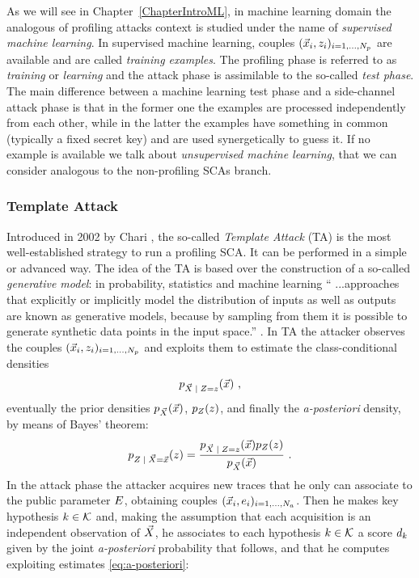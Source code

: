 As we will see in Chapter~\ref{ChapterIntroML}, in machine learning domain the analogous of profiling attacks context is studied under the name of \emph{supervised machine learning}. In supervised machine learning, couples $(\vec{x}_i, z_i)_{i=1, \dots , N_p}$ are available and are called \emph{training examples}. The profiling phase is referred to as \emph{training} or \emph{learning} and the attack phase is assimilable to the so-called \emph{test phase}. The main difference between a machine learning test phase and a side-channel attack phase is that in the former one the examples are processed independently from each other, while in the latter the examples have something in common (typically a fixed secret key) and are used synergetically to guess it. If no example is available we talk about \emph{unsupervised machine learning}, that we can consider analogous to the non-profiling SCAs branch. 




\subsubsection{Template Attack}\label{sec:TA}
Introduced in 2002 by Chari \cite{Chari2003}, the so-called \emph{Template Attack} (TA) is the most well-established strategy to run a profiling SCA. It can be performed in a simple or advanced way. The idea of the TA is based over the construction of a so-called \emph{generative model}: in probability, statistics and machine learning \enquote{ ...approaches that explicitly or implicitly model the distribution of inputs as well as outputs are known as generative models, because by sampling from them it is possible to generate synthetic data points in the input space.} \cite{christopher2006pattern}.
In TA the attacker observes the couples $(\vec{x}_i, z_i)_{i=1, \dots , N_p}$  and exploits them to estimate the class-conditional densities  
\begin{equation}\label{eq:class-conditional}
\pdf_{\given{\vaLeakVec}{\sensRandVar = \sensVar}}(\vLeakVec)\mbox{ ,}
\end{equation}
eventually the prior densities $p_{\vec{X}}(\vec{x})$, $p_{Z}(z)$, and finally the \textit{a-posteriori} density, by means of Bayes' theorem:
\begin{equation}\label{eq:a-posteriori}
\pdf_{\given{\sensRandVar}{  \vaLeakVec = \vLeakVec}}(\sensVar) = \frac{\pdf_{\given{\vaLeakVec}{\sensRandVar = \sensVar}}(\vLeakVec)\pdf_{\sensRandVar}(\sensVar)} {\pdf_{\vaLeakVec}(\vLeakVec)}\mbox{ .}
\end{equation}
In the attack phase the attacker acquires new traces that he only can associate to the public parameter $E$, obtaining couples  $(\vec{x}_i, e_i)_{i=1, \dots , N_a}$. Then he makes key hypothesis $k \in \mathcal{K}$ and, making the assumption that each acquisition is an independent observation of $\vec{X}$, he associates to each hypothesis $k \in \mathcal{K}$ a score $d_k$ given by the joint \textit{a-posteriori} probability that follows, and that he computes exploiting estimates \eqref{eq:a-posteriori}:

